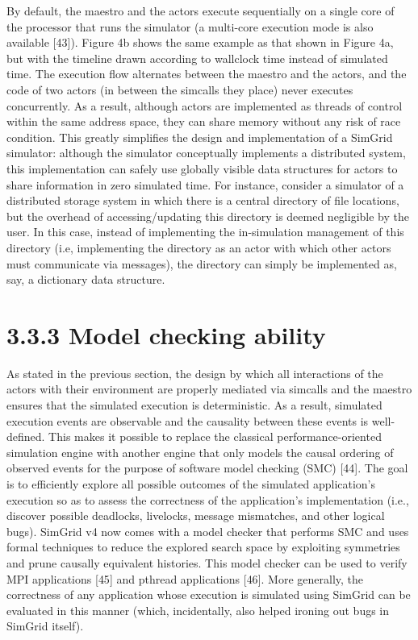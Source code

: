 \documentclass[
]{article}
\begin{document}
By default, the maestro and the actors execute sequentially on a single
core of the processor that runs the simulator (a multi-core execution
mode is also available {[}43{]}). Figure 4b shows the same example as
that shown in Figure 4a, but with the timeline drawn according to
wallclock time instead of simulated time. The execution flow alternates
between the maestro and the actors, and the code of two actors (in
between the simcalls they place) never executes concurrently. As a
result, although actors are implemented as threads of control within the
same address space, they can share memory without any risk of race
condition. This greatly simplifies the design and implementation of a
SimGrid simulator: although the simulator conceptually implements a
distributed system, this implementation can safely use globally visible
data structures for actors to share information in zero simulated time.
For instance, consider a simulator of a distributed storage system in
which there is a central directory of file locations, but the overhead
of accessing/updating this directory is deemed negligible by the user.
In this case, instead of implementing the in-simulation management of
this directory (i.e, implementing the directory as an actor with which
other actors must communicate via messages), the directory can simply be
implemented as, say, a dictionary data structure.

\section{3.3.3 Model checking ability}\label{model-checking-ability}

As stated in the previous section, the design by which all interactions
of the actors with their environment are properly mediated via simcalls
and the maestro ensures that the simulated execution is deterministic.
As a result, simulated execution events are observable and the causality
between these events is well-defined. This makes it possible to replace
the classical performance-oriented simulation engine with another engine
that only models the causal ordering of observed events for the purpose
of software model checking (SMC) {[}44{]}. The goal is to efficiently
explore all possible outcomes of the simulated application's execution
so as to assess the correctness of the application's implementation
(i.e., discover possible deadlocks, livelocks, message mismatches, and
other logical bugs). SimGrid v4 now comes with a model checker that
performs SMC and uses formal techniques to reduce the explored search
space by exploiting symmetries and prune causally equivalent histories.
This model checker can be used to verify MPI applications {[}45{]} and
pthread applications {[}46{]}. More generally, the correctness of any
application whose execution is simulated using SimGrid can be evaluated
in this manner (which, incidentally, also helped ironing out bugs in
SimGrid itself).
\end{document}
